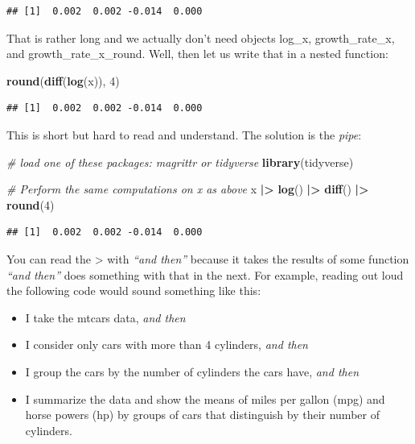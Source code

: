 \documentclass[
  12pt,
  oneside]{book}
\newenvironment{Shaded}{\begin{snugshade}}{\end{snugshade}}
\newcommand{\CommentTok}[1]{\textcolor[rgb]{0.56,0.35,0.01}{\textit{#1}}}
\newcommand{\DecValTok}[1]{\textcolor[rgb]{0.00,0.00,0.81}{#1}}
\newcommand{\FunctionTok}[1]{\textcolor[rgb]{0.13,0.29,0.53}{\textbf{#1}}}
\newcommand{\NormalTok}[1]{#1}
\newcommand{\SpecialCharTok}[1]{\textcolor[rgb]{0.81,0.36,0.00}{\textbf{#1}}}
\providecommand{\tightlist}{%
  \setlength{\itemsep}{0pt}\setlength{\parskip}{0pt}}
\begin{document}
\begin{verbatim}
## [1]  0.002  0.002 -0.014  0.000
\end{verbatim}

That is rather long and we actually don't need objects log\_x, growth\_rate\_x, and growth\_rate\_x\_round.
Well, then let us write that in a nested function:

\begin{Shaded}
\begin{Highlighting}[]
\FunctionTok{round}\NormalTok{(}\FunctionTok{diff}\NormalTok{(}\FunctionTok{log}\NormalTok{(x)), }\DecValTok{4}\NormalTok{)}
\end{Highlighting}
\end{Shaded}

\begin{verbatim}
## [1]  0.002  0.002 -0.014  0.000
\end{verbatim}

This is short but hard to read and understand. The solution is the \emph{pipe}:

\begin{Shaded}
\begin{Highlighting}[]
\CommentTok{\# load one of these packages: \textasciigrave{}magrittr\textasciigrave{} or \textasciigrave{}tidyverse\textasciigrave{}}
\FunctionTok{library}\NormalTok{(tidyverse)}

\CommentTok{\# Perform the same computations on \textasciigrave{}x\textasciigrave{} as above}
\NormalTok{x }\SpecialCharTok{|\textgreater{}} 
  \FunctionTok{log}\NormalTok{() }\SpecialCharTok{|\textgreater{}}
  \FunctionTok{diff}\NormalTok{() }\SpecialCharTok{|\textgreater{}}
  \FunctionTok{round}\NormalTok{(}\DecValTok{4}\NormalTok{)}
\end{Highlighting}
\end{Shaded}

\begin{verbatim}
## [1]  0.002  0.002 -0.014  0.000
\end{verbatim}

You can read the \textbar\textgreater{} with \emph{``and then''} because it takes the results of some function \emph{``and then''} does something with that in the next.
For example, reading out loud the following code would sound something like this:

\begin{itemize}
\tightlist
\item
  I take the mtcars data, \emph{and then}
\item
  I consider only cars with more than 4 cylinders, \emph{and then}
\item
  I group the cars by the number of cylinders the cars have, \emph{and then}
\item
  I summarize the data and show the means of miles per gallon (mpg) and horse powers (hp) by groups of cars that distinguish by their number of cylinders.
\end{itemize}
\end{document}
